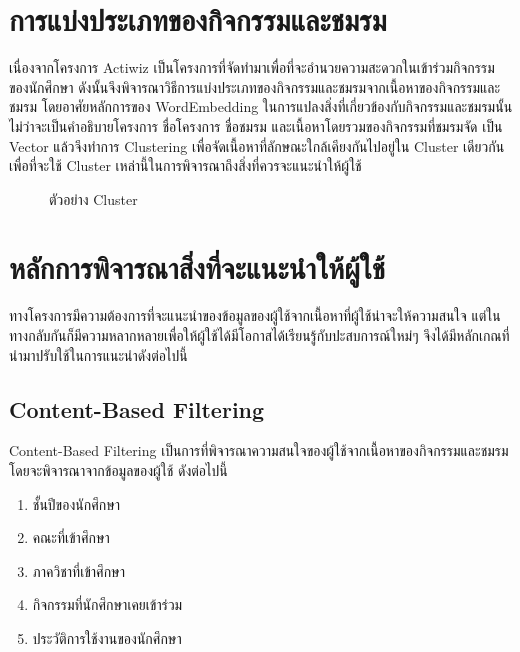 \documentclass[14pt,oneside,openright,a4paper]{cpe-thai-project}
\begin{document}
\section{การแบ่งประเภทของกิจกรรมและชมรม}
เนื่องจากโครงการ Actiwiz เป็นโครงการที่จัดทำมาเพื่อที่จะอำนวยความสะดวกในเข้าร่วมกิจกรรมของนักศึกษา ดังนั้นจึงพิจารณาวิธีการแบ่งประเภทของกิจกรรมและชมรมจากเนื้อหาของกิจกรรมและชมรม โดยอาศัยหลักการของ WordEmbedding ในการแปลงสิ่งที่เกี่ยวข้องกับกิจกรรมและชมรมนั้น ไม่ว่าจะเป็นคำอธิบายโครงการ ชื่อโครงการ ชื่อชมรม และเนื้อหาโดยรวมของกิจกรรมที่ชมรมจัด เป็น Vector แล้วจึงทำการ Clustering เพื่อจัดเนื้อหาที่ลักษณะใกล้เคียงกันไปอยู่ใน Cluster เดียวกัน เพื่อที่จะใช้ Cluster เหล่านี้ในการพิจารณาถึงสิ่งที่ควรจะแนะนำให้ผู้ใช้
\begin{figure}[!h]\centering
  \setlength{\fboxrule}{0.5mm} %
  \setlength{\fboxsep}{0.5cm}
  \caption{ตัวอย่าง Cluster}\label{fig:project_cluster}
\end{figure}

\newpage

\section{หลักการพิจารณาสิ่งที่จะแนะนำให้ผู้ใช้}
ทางโครงการมีความต้องการที่จะแนะนำของข้อมูลของผู้ใช้จากเนื้อหาที่ผู้ใช้น่าจะให้ความสนใจ แต่ในทางกลับกันก็มีความหลากหลายเพื่อให้ผู้ใช้ได้มีโอกาสได้เรียนรู้กับปะสบการณ์ใหม่ๆ จึงได้มีหลักเกณที่นำมาปรับใช้ในการแนะนำดังต่อไปนี้
\subsection{Content-Based Filtering}
Content-Based Filtering เป็นการที่พิจารณาความสนใจของผู้ใช้จากเนื้อหาของกิจกรรมและชมรม โดยจะพิจารณาจากข้อมูลของผู้ใช้ ดังต่อไปนี้
\begin{enumerate}
  \item ชั้นปีของนักศึกษา
  \item คณะที่เข้าศึกษา
  \item ภาควิชาที่เข้าศึกษา
  \item กิจกรรมที่นักศึกษาเคยเข้าร่วม
  \item ประวัติการใช้งานของนักศึกษา
\end{enumerate}
\end{document}
